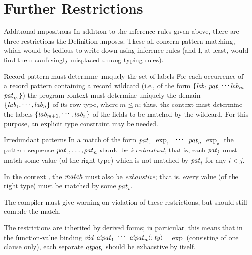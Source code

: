 \section{Further Restrictions}

\begin{remark}{Additional impositions}
In addition to the inference rules given above, there are three
restrictions the Definition imposes. These all concern pattern matching,
which would be tedious to write down using inference rules (and I, at
least, would find them confusingly misplaced among typing rules).
\end{remark}

\begin{clause}{Record pattern must determine uniquely the set of labels}
For each occurrence of a record pattern containing a record wildcard
(i.e., of the form
\verb+{+${\it lab}_{1}$\ml{=}$\textit{pat\/}_{1}$\ml{,}$\mathinner{{}^{\textstyle .\,.\,.}}$\ml{,}${\it lab}_{m}$\ml{=}$\textit{pat\/}_{m}$\ml{,}\wildcardrow\verb+}+)
the program context must determine uniquely the domain
$\{{\it lab}_{1},\mathinner{{}^{\textstyle .\,.\,.}},{\it lab}_{n}\}$
of its row type, where $m\leq n$; thus, the context must
determine the labels $\{{\it lab}_{m+1},\mathinner{{}^{\textstyle .\,.\,.}},{\it lab}_{n}\}$ of the fields
to be matched by the wildcard. For this purpose, an explicit type
constraint may be needed.
\end{clause}

\begin{clause}{Irredundant patterns}
In a match of the form $\textit{pat\/}_{1}$ \ml{=>} $\exp_{1}$ \ml{|}$\;\mathinner{{}^{\textstyle .\,.\,.}}\;$
\ml{|} $\textit{pat\/}_{n}$ \ml{=>} $\exp_{n}$ 
the pattern sequence $\textit{pat\/}_{1},\ldots,\textit{pat\/}_{n}$ should be \emph{irredundant};
that is, each $\textit{pat\/}_{j}$ must match some value
(of the right type) which is not matched by $\textit{pat\/}_{i}$ for any $i<j$.

In the context {\fnexp}, the $\textit{match\/}$ must also be \emph{exhaustive}; that is,
every value (of the right type) must be matched by some $\textit{pat\/}_i$.

The compiler must give warning on violation of these restrictions, 
but should still compile the match. 

The restrictions are inherited by derived forms; in particular,
this means that in the function-value binding
$\textit{vid\/}\ \textit{atpat\/}_{1}\ \mathinner{{}^{\textstyle .\,.\,.}}\ \textit{atpat\/}_{n}\langle : \textit{ty\/}\rangle$\ \ml{=}\ $\exp$
(consisting of one clause only), each separate $\textit{atpat\/}_{i}$ should be
exhaustive by itself.
\end{clause}

